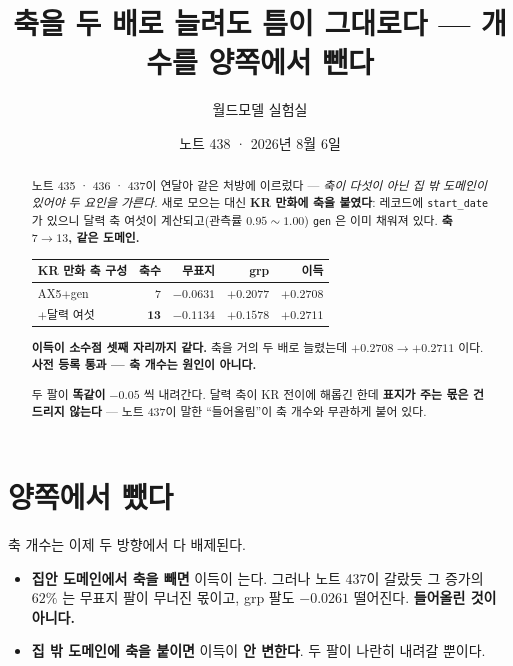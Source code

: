 \documentclass[11pt]{article}
\begin{document}
\title{축을 두 배로 늘려도 틈이 그대로다 --- 개수를 양쪽에서 뺀다}
\author{월드모델 실험실}
\date{노트 438 · 2026년 8월 6일}
\maketitle

\begin{abstract}
노트 435 · 436 · 437이 연달아 같은 처방에 이르렀다 --- \emph{축이 다섯이 아닌
집 밖 도메인이 있어야 두 요인을 가른다.} 새로 모으는 대신 \textbf{KR 만화에
축을 붙였다}: 레코드에 \texttt{start\_date} 가 있으니 달력 축 여섯이
계산되고(관측률 $0.95 \sim 1.00$) \texttt{gen} 은 이미 채워져 있다.
\textbf{축 $7 \to 13$, 같은 도메인.}

\begin{center}
\begin{tabular}{lrrrr}
\hline
KR 만화 축 구성 & 축수 & 무표지 & grp & 이득 \\
\hline
AX5$+$gen & $7$ & $-0.0631$ & $+0.2077$ & $\mathbf{+0.2708}$ \\
$+$달력 여섯 & $\mathbf{13}$ & $-0.1134$ & $+0.1578$ & $\mathbf{+0.2711}$ \\
\hline
\end{tabular}
\end{center}

\textbf{이득이 소수점 셋째 자리까지 같다.} 축을 거의 두 배로 늘렸는데
$+0.2708 \to +0.2711$ 이다. \textbf{사전 등록 통과 --- 축 개수는 원인이
아니다.}

두 팔이 \textbf{똑같이} $-0.05$ 씩 내려간다. 달력 축이 KR 전이에 해롭긴 한데
\textbf{표지가 주는 몫은 건드리지 않는다} --- 노트 437이 말한 ``들어올림''이
축 개수와 무관하게 붙어 있다.
\end{abstract}

\section{양쪽에서 뺐다}

축 개수는 이제 두 방향에서 다 배제된다.

\begin{itemize}
\item \textbf{집안 도메인에서 축을 빼면} 이득이 는다. 그러나 노트 437이
갈랐듯 그 증가의 $62\%$ 는 무표지 팔이 무너진 몫이고, grp 팔도 $-0.0261$
떨어진다. \textbf{들어올린 것이 아니다.}
\item \textbf{집 밖 도메인에 축을 붙이면} 이득이 \textbf{안 변한다}. 두 팔이
나란히 내려갈 뿐이다.
\end{itemize}
\end{document}
